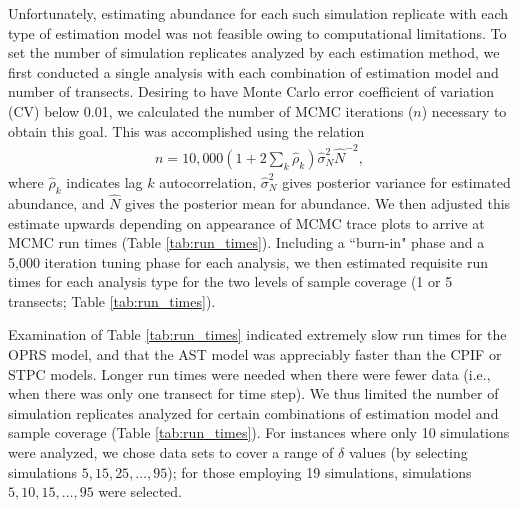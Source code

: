 \documentclass[12pt,fleqn]{article}
\begin{document}
\begin{flushleft}
\hspace{.5in} Unfortunately, estimating abundance for each such simulation replicate with each type of estimation model was not feasible owing to computational limitations.  To set the number of simulation replicates analyzed by each estimation method, we first conducted a single analysis with each combination of estimation model and number of transects.  Desiring to have Monte Carlo error coefficient of variation (CV) below 0.01, we calculated the number of MCMC iterations ($n$) necessary to obtain this goal.  This was accomplished using the relation
\begin{eqnarray*}
  n = 10,000(1+2 \sum_k \hat{\rho}_k)\hat{\sigma}_N^2 \hat{N}^{-2},
\end{eqnarray*}
where $\hat{\rho}_k$ indicates lag $k$ autocorrelation, $\hat{\sigma}_N^2$ gives posterior variance for
estimated abundance, and $\hat{N}$ gives the posterior mean for abundance.  We then adjusted this estimate upwards depending on appearance of MCMC trace plots to arrive at MCMC run times (Table \ref{tab:run_times}). Including a ``burn-in" phase and a 5,000 iteration tuning phase for each analysis, we then estimated requisite run times for each analysis type for the two levels of sample coverage (1 or 5 transects; Table \ref{tab:run_times}).



\hspace{.5in} Examination of Table \ref{tab:run_times} indicated extremely slow run times for the OPRS model, and that the AST model was appreciably faster than the CPIF or STPC models.  Longer run times were needed when there were fewer data (i.e., when there was only one transect for time step).  We thus limited the number of simulation replicates analyzed for certain combinations of estimation model and sample coverage (Table \ref{tab:run_times}).  For instances where only 10 simulations were analyzed, we chose data sets to cover a range of $\delta$ values (by selecting simulations $5, 15, 25, \hdots, 95$); for those employing 19 simulations, simulations $5, 10, 15, \hdots, 95$ were selected.


\end{flushleft}
\end{document}
